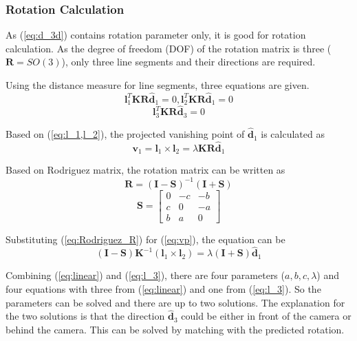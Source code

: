 \documentclass[letterpaper, 10 pt, conference]{ieeeconf}  %
\begin{document}
\subsubsection{Rotation Calculation}
As (\ref{eq:d_3d}) contains rotation parameter only, it is good for rotation calculation. As the degree of freedom (DOF) of the rotation matrix is three ($\mathbf{R}=SO(3)$), only three line segments and their directions are required.

Using the distance measure for line segments, three equations are given.
\begin{equation}
\mathbf{l}_1^T\mathbf{K}\mathbf{R}\hat{\mathbf{d}}_1=0, \mathbf{l}_2^T\mathbf{K}\mathbf{R}\hat{\mathbf{d}}_1=0
\label{eq:l_1,l_2}
\end{equation}
\begin{equation}
\mathbf{l}_3^T\mathbf{K}\mathbf{R}\hat{\mathbf{d}}_3=0
\label{eq:l_3}
\end{equation}

Based on (\ref{eq:l_1,l_2}), the projected vanishing point of $\hat{\mathbf{d}}_1$ is calculated as
\begin{equation}
\mathbf{v}_1 = \mathbf{l}_1\times \mathbf{l}_2 =  \lambda \mathbf{K}\mathbf{R}\hat{\mathbf{d}}_1
\label{eq:vp}
\end{equation}

Based on Rodriguez matrix, the rotation matrix can be written as
\begin{equation}
\mathbf{R}=\left(\mathbf{I}-\mathbf{S}\right)^{-1}\left(\mathbf{I}+\mathbf{S}\right)
\label{eq:Rodriguez_R}
\end{equation}
\begin{equation}
\mathbf{S}=\begin{bmatrix}      0 & -c & -b \\
                                c & 0 & -a \\
                                b & a & 0
                    \end{bmatrix}
\label{eq:Rodriguez_S}
\end{equation}

Substituting (\ref{eq:Rodriguez_R}) for (\ref{eq:vp}), the equation can be
\begin{equation}
(\mathbf{I}-\mathbf{S})\mathbf{K}^{-1}(\mathbf{l}_1\times \mathbf{l}_2)
= \lambda (\mathbf{I}+\mathbf{S})\hat{\mathbf{d}}_1
\label{eq:linear}
\end{equation}

Combining (\ref{eq:linear}) and (\ref{eq:l_3}), there are four parameters ($a,b,c,\lambda$) and four equations with three from (\ref{eq:linear}) and one from (\ref{eq:l_3}). So the parameters can be solved and there are up to two solutions. The explanation for the two solutions is that the direction $\hat{\mathbf{d}}_3$ could be either in front of the camera or behind the camera. This can be solved by matching with the predicted rotation.
\end{document}
